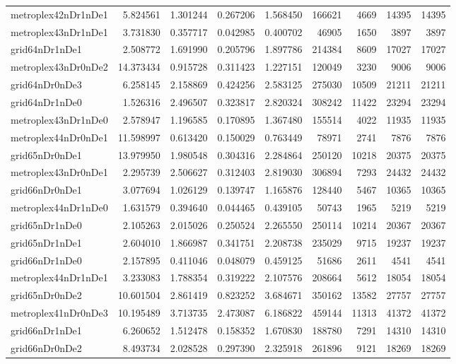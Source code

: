 \begin{longtable}{|l|r|r|r|r|r|r|r|r|}
metroplex42nDr1nDe1 & 5.824561 & 1.301244 & 0.267206 & 1.568450 & 166621 & 4669 & 14395 & 14395 \\
metroplex43nDr1nDe1 & 3.731830 & 0.357717 & 0.042985 & 0.400702 & 46905 & 1650 & 3897 & 3897 \\
grid64nDr1nDe1 & 2.508772 & 1.691990 & 0.205796 & 1.897786 & 214384 & 8609 & 17027 & 17027 \\
metroplex43nDr0nDe2 & 14.373434 & 0.915728 & 0.311423 & 1.227151 & 120049 & 3230 & 9006 & 9006 \\
grid64nDr0nDe3 & 6.258145 & 2.158869 & 0.424256 & 2.583125 & 275030 & 10509 & 21211 & 21211 \\
grid64nDr1nDe0 & 1.526316 & 2.496507 & 0.323817 & 2.820324 & 308242 & 11422 & 23294 & 23294 \\
metroplex43nDr1nDe0 & 2.578947 & 1.196585 & 0.170895 & 1.367480 & 155514 & 4022 & 11935 & 11935 \\
metroplex44nDr0nDe1 & 11.598997 & 0.613420 & 0.150029 & 0.763449 & 78971 & 2741 & 7876 & 7876 \\
grid65nDr0nDe1 & 13.979950 & 1.980548 & 0.304316 & 2.284864 & 250120 & 10218 & 20375 & 20375 \\
metroplex43nDr0nDe1 & 2.295739 & 2.506627 & 0.312403 & 2.819030 & 306894 & 7293 & 24432 & 24432 \\
grid66nDr0nDe1 & 3.077694 & 1.026129 & 0.139747 & 1.165876 & 128440 & 5467 & 10365 & 10365 \\
metroplex44nDr1nDe0 & 1.631579 & 0.394640 & 0.044465 & 0.439105 & 50743 & 1965 & 5219 & 5219 \\
grid65nDr1nDe0 & 2.105263 & 2.015026 & 0.250524 & 2.265550 & 250114 & 10214 & 20367 & 20367 \\
grid65nDr1nDe1 & 2.604010 & 1.866987 & 0.341751 & 2.208738 & 235029 & 9715 & 19237 & 19237 \\
grid66nDr1nDe0 & 2.157895 & 0.411046 & 0.048079 & 0.459125 & 51686 & 2611 & 4541 & 4541 \\
metroplex44nDr1nDe1 & 3.233083 & 1.788354 & 0.319222 & 2.107576 & 208664 & 5612 & 18054 & 18054 \\
grid65nDr0nDe2 & 10.601504 & 2.861419 & 0.823252 & 3.684671 & 350162 & 13582 & 27757 & 27757 \\
metroplex41nDr0nDe3 & 10.195489 & 3.713735 & 2.473087 & 6.186822 & 459144 & 11313 & 41372 & 41372 \\
grid66nDr1nDe1 & 6.260652 & 1.512478 & 0.158352 & 1.670830 & 188780 & 7291 & 14310 & 14310 \\
grid66nDr0nDe2 & 8.493734 & 2.028528 & 0.297390 & 2.325918 & 261896 & 9121 & 18269 & 18269 \\

\end{longtable}
